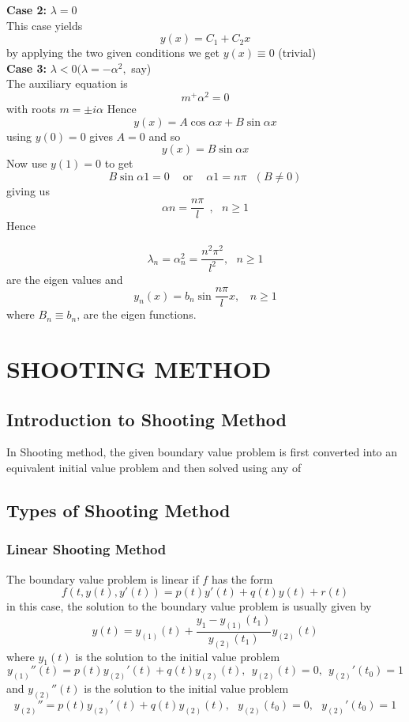 \documentclass[12pt]{report}
\newcommand{\bt}[1]{\textbf{#1}}
\newcommand{\sps}{\\[0.2cm]}
\newcommand{\NI}{\noindent}
\newcommand{\sprime}{'}
\newcommand{\dprime}{''}
\begin{document}
	\NI\bt{Case 2:} $\lambda = 0$\sps
	This case yields
	$$
		y(x) = C_1 + C_2 x
	$$
	by applying the two given conditions we get $y(x) \equiv 0$ (trivial)\sps
	
	\NI\bt{Case 3:} $\lambda < 0 (\lambda = -\alpha^2,$ say)\sps
	The auxiliary equation is
	$$
		m^ + \alpha^2 = 0
	$$
	with roots $m=\pm i\alpha$ Hence
	$$
		y(x) = A\cos \alpha x + B\sin\alpha x
	$$
	using $y(0) = 0$ gives $A=0$ and so
	$$
		y(x) = B\sin\alpha x
	$$
	Now use $y(1)=0$ to get
	$$
		B\sin\alpha 1 = 0 ~~~~ \text{ or } ~~~~ \alpha 1 = n\pi ~~~ (B\neq 0)
	$$
	giving us
	$$
		\alpha n = \frac{n\pi}{l} ~~, ~~~ n\geq 1
	$$
	Hence
	
	$$
		\lambda_n = \alpha_n^2 = \frac{n^2\pi^2}{l^2}, ~~~ n \geq 1
	$$
	are the eigen values and 
	$$
		y_n(x) = b_n\sin \frac{n\pi}{l}x, ~~~~ n\geq 1
	$$
	where $B_n \equiv b_n$, are the eigen functions.
	
	
	\chapter{SHOOTING METHOD}
	
	\section{Introduction to Shooting Method}
	In Shooting method, the given boundary value problem is first converted into an equivalent initial value problem and then solved using any of
	
	\section{Types of Shooting Method}
	\subsection{Linear Shooting Method}
	The boundary value problem is linear if $f$ has the form
	\begin{equation}
		f(t, y(t), y\sprime(t)) = p(t)y\sprime(t) + q(t)y(t) + r(t)
	\end{equation}
	in this case, the solution to the boundary value problem is usually given by
	\begin{equation}
		y(t) = y_{(1)}(t) + \frac{y_1 - y_{(1)}(t_1)}{y_{(2)}(t_1)}y_{(2)}(t)
	\end{equation}
	where $y_1(t)$ is the solution to the initial value problem 
	\begin{equation}
		y_{(1)}\dprime(t) = p(t)y_{(2)}\sprime(t) + q(t)y_{(2)}(t), ~~ y_{(2)}(t) = 0, ~~ y_{(2)}\sprime(t_0) = 1
	\end{equation}
	and $y_{(2)}\dprime (t)$ is the solution to the initial value problem
	\begin{equation}
		y_{(2)}\dprime = p(t)y_{(2)}\sprime(t) + q(t)y_{(2)}(t), ~~~ y_{(2)}(t_0)  = 0, ~~~ y_{(2)}\sprime(t_0) = 1
	\end{equation}
	
\end{document}
